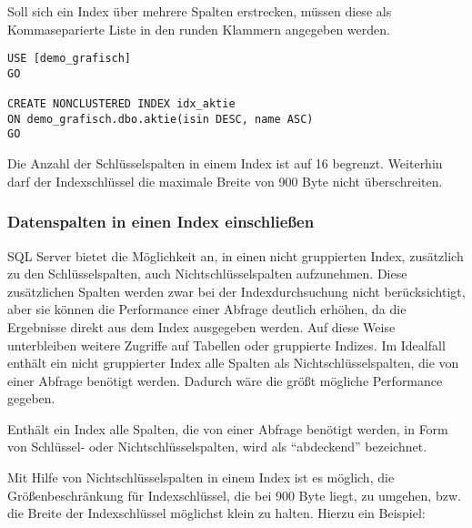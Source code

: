         Soll sich ein Index über mehrere Spalten erstrecken, müssen diese als
        Kommaseparierte Liste in den runden Klammern angegeben werden.
        \begin{lstlisting}[language=ms_sql, caption={Erstellen eines
        nicht gruppierten Index mit mehreren Spalten}, label=admin05_09]
USE [demo_grafisch]
GO

CREATE NONCLUSTERED INDEX idx_aktie
ON demo_grafisch.dbo.aktie(isin DESC, name ASC)
GO
        \end{lstlisting}
        \begin{merke}
          Die Anzahl der Schlüsselspalten in einem Index ist auf 16 begrenzt.
          Weiterhin darf der Indexschlüssel die maximale Breite von 900 Byte
          nicht überschreiten.
        \end{merke}
        \begin{literaturinternet}
          \item \cite{ms189280}
        \end{literaturinternet}       
      \subsubsection{Datenspalten in einen Index einschließen}
        SQL Server bietet die Möglichkeit an, in einen nicht gruppierten Index,
        zusätzlich zu den Schlüsselspalten, auch Nichtschlüsselspalten
        aufzunehmen. Diese zusätzlichen Spalten werden zwar bei der
        Indexdurchsuchung nicht berücksichtigt, aber sie können die Performance
        einer Abfrage deutlich erhöhen, da die Ergebnisse direkt aus dem Index
        ausgegeben werden. Auf diese Weise unterbleiben weitere Zugriffe auf
        Tabellen oder gruppierte Indizes. Im Idealfall enthält ein nicht
        gruppierter Index alle Spalten als Nichtschlüsselspalten, die von einer
        Abfrage benötigt werden. Dadurch wäre die größt mögliche Performance
        gegeben.
        \begin{merke}
          Enthält ein Index alle Spalten, die von einer Abfrage benötigt werden,
          in Form von Schlüssel- oder Nichtschlüsselspalten, wird als
          \enquote{abdeckend} bezeichnet.
        \end{merke}
        Mit Hilfe von Nichtschlüsselspalten in einem Index ist es möglich, die
        Größenbeschränkung für Indexschlüssel, die bei 900 Byte liegt, zu
        umgehen, bzw. die Breite der Indexschlüssel möglichst klein zu halten.
        Hierzu ein Beispiel:
        
